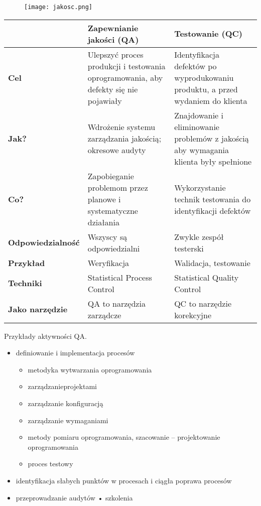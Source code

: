 \documentclass[../main.tex]{subfiles}
\begin{document}
    \begin{figure}[H]
        \texttt{[image: jakosc.png]}
    \end{figure}


    \begin{table}[H]
        \begin{center}
            \begin{tabular}{| p{3cm} | p{5cm} | p{5cm} |}
                \hline
                & \textbf{Zapewnianie jakości (QA)} & \textbf{Testowanie (QC)}\\
                \hline
                \textbf{Cel} & Ulepszyć proces produkcji i testowania oprogramowania,
                aby defekty się nie pojawiały & Identyfikacja defektów po wyprodukowaniu produktu,
                a przed wydaniem do klienta\\
                \hline
                \textbf{Jak?} & Wdrożenie systemu zarządzania jakością; okresowe audyty &
                Znajdowanie i eliminowanie problemów z jakością aby wymagania klienta były spełnione\\
                \hline
                \textbf{Co?} & Zapobieganie problemom przez planowe i systematyczne działania
                & Wykorzystanie technik testowania do identyfikacji defektów\\
                \hline
                \textbf{Odpowiedzialność} & Wszyscy są odpowiedzialni & Zwykle zespół testerski\\
                \hline
                \textbf{Przykład} & Weryfikacja & Walidacja, testowanie\\
                \hline
                \textbf{Techniki} & Statistical Process Control & Statistical Quality Control\\
                \hline
                \textbf{Jako narzędzie} & QA to narzędzia zarządcze & QC to narzędzie korekcyjne\\
                \hline
            \end{tabular}
        \end{center}
    \end{table}

    Przykłady aktywności QA.
    \begin{itemize}
        \item definiowanie i implementacja procesów
        \begin{itemize}
            \item metodyka wytwarzania oprogramowania
            \item zarządzanieprojektami
            \item zarządzanie konfiguracją
            \item zarządzanie wymaganiami
            \item metody pomiaru oprogramowania, szacowanie – projektowanie oprogramowania
            \item proces testowy
        \end{itemize}
        \item identyfikacja słabych punktów w procesach i ciągła poprawa procesów
        \item przeprowadzanie audytów • szkolenia
    \end{itemize}
\end{document}
